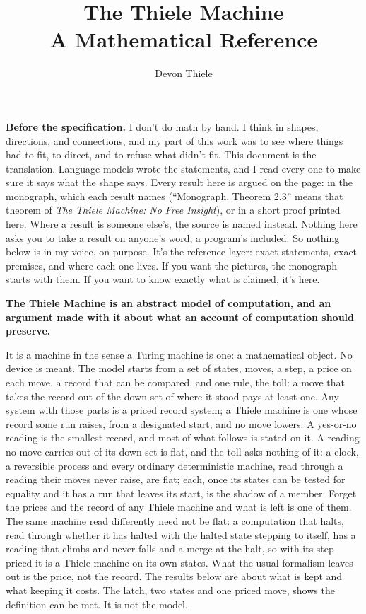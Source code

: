 \documentclass[11pt, a4paper]{report}
\title{\textbf{The Thiele Machine}\\ \large A Mathematical Reference}
\author{Devon Thiele}
\date{}
\theoremstyle{definition}
\theoremstyle{plain}
\begin{document}
\maketitle

\noindent\textbf{Before the specification.} I don't do math by hand. I think in shapes, directions, and connections, and my part of this work was to see where things had to fit, to direct, and to refuse what didn't fit. This document is the translation. Language models wrote the statements, and I read every one to make sure it says what the shape says. Every result here is argued on the page: in the monograph, which each result names (``Monograph, Theorem 2.3'' means that theorem of \textit{The Thiele Machine: No Free Insight}), or in a short proof printed here. Where a result is someone else's, the source is named instead. Nothing here asks you to take a result on anyone's word, a program's included. So nothing below is in my voice, on purpose. It's the reference layer: exact statements, exact premises, and where each one lives. If you want the pictures, the monograph starts with them. If you want to know exactly what is claimed, it's here.

\medskip

\noindent\textbf{The Thiele Machine is an abstract model of computation, and an argument made with it about what an account of computation should preserve.}

It is a machine in the sense a Turing machine is one: a mathematical object. No device is meant. The model starts from a set of states, moves, a step, a price on each move, a record that can be compared, and one rule, the toll: a move that takes the record out of the down-set of where it stood pays at least one. Any system with those parts is a priced record system; a Thiele machine is one whose record some run raises, from a designated start, and no move lowers. A yes-or-no reading is the smallest record, and most of what follows is stated on it. A reading no move carries out of its down-set is flat, and the toll asks nothing of it: a clock, a reversible process and every ordinary deterministic machine, read through a reading their moves never raise, are flat; each, once its states can be tested for equality and it has a run that leaves its start, is the shadow of a member. Forget the prices and the record of any Thiele machine and what is left is one of them. The same machine read differently need not be flat: a computation that halts, read through whether it has halted with the halted state stepping to itself, has a reading that climbs and never falls and a merge at the halt, so with its step priced it is a Thiele machine on its own states. What the usual formalism leaves out is the price, not the record. The results below are about what is kept and what keeping it costs. The latch, two states and one priced move, shows the definition can be met. It is not the model.
\end{document}

